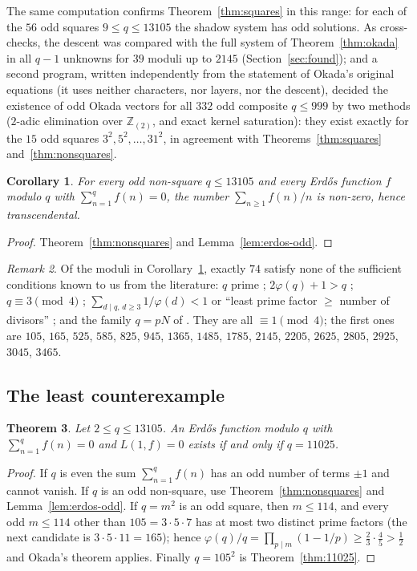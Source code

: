 \documentclass[11pt]{amsart}
\newtheorem{theorem}{Theorem}[section]
\newtheorem{corollary}[theorem]{Corollary}
\theoremstyle{definition}
\theoremstyle{remark}
\newtheorem{remark}[theorem]{Remark}
\newcommand{\Zt}{\mathbb Z_{(2)}}
\numberwithin{equation}{section}
\begin{document}
The same computation confirms Theorem~\ref{thm:squares} in this range: for each of the $56$ odd squares $9\le q\le13105$ the shadow system has odd solutions.
As cross-checks, the descent was compared with the full system of Theorem~\ref{thm:okada} in all $q-1$ unknowns for $39$ moduli up to $2145$ (Section~\ref{sec:found}); and a second program, written independently from the statement of Okada's original equations (it uses neither characters, nor layers, nor the descent), decided the existence of odd Okada vectors for all $332$ odd composite $q\le999$ by two methods ($2$-adic elimination over $\Zt$, and exact kernel saturation): they exist exactly for the $15$ odd squares $3^2,5^2,\dots,31^2$, in agreement with Theorems~\ref{thm:squares} and~\ref{thm:nonsquares}.

\begin{corollary}\label{cor:transc}
For every odd non-square $q\le13105$ and every Erd\H{o}s function $f$ modulo $q$ with $\sum_{n=1}^qf(n)=0$, the number $\sum_{n\ge1}f(n)/n$ is non-zero, hence transcendental.
\end{corollary}

\begin{proof}
Theorem~\ref{thm:nonsquares} and Lemma~\ref{lem:erdos-odd}.
\end{proof}

\begin{remark}\label{rem:new}
Of the moduli in Corollary~\ref{cor:transc}, exactly $74$ satisfy none of the sufficient conditions known to us from the literature: $q$ prime \cite{BBW73}; $2\varphi(q)+1>q$ \cite{Oka82}; $q\equiv3\pmod4$ \cite{MS10}; $\sum_{d\mid q,\,d\ge3}1/\varphi(d)<1$ or ``least prime factor $\ge$ number of divisors'' \cite[Prop.~3.1, Cor.~3.3]{CM15}; and the family $q=pN$ of \cite[Cor.~1]{Bha22}.
They are all $\equiv1\pmod4$; the first ones are
$105$, $165$, $525$, $585$, $825$, $945$, $1365$, $1485$, $1785$, $2145$, $2205$, $2625$, $2805$, $2925$, $3045$, $3465$.
\end{remark}

\subsection{The least counterexample}
\begin{theorem}\label{thm:least}
Let $2\le q\le13105$.
An Erd\H{o}s function modulo $q$ with $\sum_{n=1}^qf(n)=0$ and $L(1,f)=0$ exists if and only if $q=11025$.
\end{theorem}

\begin{proof}
If $q$ is even the sum $\sum_{n=1}^qf(n)$ has an odd number of terms $\pm1$ and cannot vanish.
If $q$ is an odd non-square, use Theorem~\ref{thm:nonsquares} and Lemma~\ref{lem:erdos-odd}.
If $q=m^2$ is an odd square, then $m\le114$, and every odd $m\le114$ other than $105=3\cdot5\cdot7$ has at most two distinct prime factors (the next candidate is $3\cdot5\cdot11=165$); hence $\varphi(q)/q=\prod_{p\mid m}(1-1/p)\ge\frac23\cdot\frac45>\frac12$ and Okada's theorem \cite{Oka82} applies.
Finally $q=105^2$ is Theorem~\ref{thm:11025}.
\end{proof}
\end{document}

